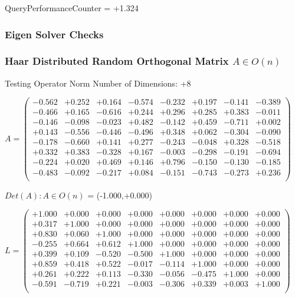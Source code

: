 \documentclass[9pt]{article}
\theoremstyle{plain}
\theoremstyle{definition}
\theoremstyle{remark}
\numberwithin{equation}{section}
\begin{document}
QueryPerformanceCounter  =  +1.324
\subsubsection{Eigen Solver Checks}
\subsubsection{Haar Distributed Random Orthogonal Matrix $A \in O(n)$}
 Testing Operator Norm
Number of Dimensions: +8

$A = \left(
\begin{array}{
cccccccc}
-0.562 & +0.252 & +0.164 & -0.574 & -0.232 & +0.197 & -0.141 & -0.389 \\
-0.466 & +0.165 & -0.616 & +0.244 & +0.296 & +0.285 & +0.383 & -0.011 \\
-0.146 & -0.098 & -0.023 & +0.482 & -0.142 & +0.459 & -0.711 & +0.002 \\
+0.143 & -0.556 & -0.446 & -0.496 & +0.348 & +0.062 & -0.304 & -0.090 \\
-0.178 & -0.660 & +0.141 & +0.277 & -0.243 & -0.048 & +0.328 & -0.518 \\
+0.332 & +0.383 & -0.328 & +0.167 & -0.003 & -0.298 & -0.191 & -0.694 \\
-0.224 & +0.020 & +0.469 & +0.146 & +0.796 & -0.150 & -0.130 & -0.185 \\
-0.483 & -0.092 & -0.217 & +0.084 & -0.151 & -0.743 & -0.273 & +0.236 \\
\end{array}
\right)$ \newline 

$Det(A) :   A \in O(n)$ = (-1.000,+0.000)

$L = \left(
\begin{array}{
cccccccc}
+1.000 & +0.000 & +0.000 & +0.000 & +0.000 & +0.000 & +0.000 & +0.000 \\
+0.317 & +1.000 & +0.000 & +0.000 & +0.000 & +0.000 & +0.000 & +0.000 \\
+0.830 & +0.060 & +1.000 & +0.000 & +0.000 & +0.000 & +0.000 & +0.000 \\
-0.255 & +0.664 & +0.612 & +1.000 & +0.000 & +0.000 & +0.000 & +0.000 \\
+0.399 & +0.109 & -0.520 & -0.500 & +1.000 & +0.000 & +0.000 & +0.000 \\
+0.859 & +0.418 & +0.522 & -0.017 & -0.114 & +1.000 & +0.000 & +0.000 \\
+0.261 & +0.222 & +0.113 & -0.330 & -0.056 & -0.475 & +1.000 & +0.000 \\
-0.591 & -0.719 & +0.221 & -0.003 & -0.306 & +0.339 & +0.003 & +1.000 \\
\end{array}
\right)$ \newline 
\end{document}
